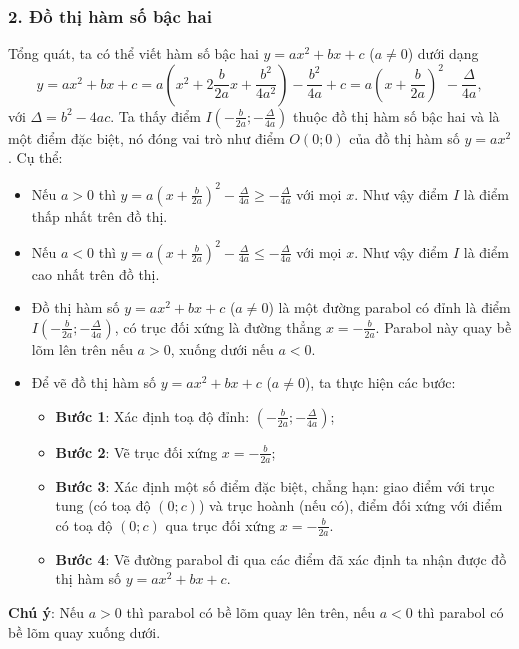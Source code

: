 \documentclass[12pt,a4paper]{extarticle}
\begin{document}
\subsubsection*{2. Đồ thị hàm số bậc hai}
Tổng quát, ta có thể viết hàm số bậc hai $y = ax^2 + bx + c$ ($a \neq 0$) dưới dạng
\[ y = ax^2 + bx + c = a \left( x^2 + 2\frac{b}{2a}x + \frac{b^2}{4a^2} \right) - \frac{b^2}{4a} + c = a \left( x + \frac{b}{2a} \right)^2 - \frac{\Delta}{4a}, \]
với $\Delta = b^2 - 4ac$.
Ta thấy điểm $I \left( -\frac{b}{2a}; -\frac{\Delta}{4a} \right)$ thuộc đồ thị hàm số bậc hai và là một điểm đặc biệt, nó đóng vai trò như điểm $O(0; 0)$ của đồ thị hàm số $y = ax^2$. Cụ thể:
\begin{itemize}
    \item Nếu $a > 0$ thì $y = a \left( x + \frac{b}{2a} \right)^2 - \frac{\Delta}{4a} \geq -\frac{\Delta}{4a}$ với mọi $x$. Như vậy điểm $I$ là điểm thấp nhất trên đồ thị.
    \item Nếu $a < 0$ thì $y = a \left( x + \frac{b}{2a} \right)^2 - \frac{\Delta}{4a} \leq -\frac{\Delta}{4a}$ với mọi $x$. Như vậy điểm $I$ là điểm cao nhất trên đồ thị.
\end{itemize}
\begin{itemize}
    \item Đồ thị hàm số $y = ax^2 + bx + c$ ($a \neq 0$) là một đường parabol có đỉnh là điểm $I \left( -\frac{b}{2a}; -\frac{\Delta}{4a} \right)$, có trục đối xứng là đường thẳng $x = -\frac{b}{2a}$. Parabol này quay bề lõm lên trên nếu $a > 0$, xuống dưới nếu $a < 0$.
    
    \item Để vẽ đồ thị hàm số $y = ax^2 + bx + c$ ($a \neq 0$), ta thực hiện các bước:
    \begin{itemize}
        \item \textbf{Bước 1}: Xác định toạ độ đỉnh: $\left( -\frac{b}{2a}; -\frac{\Delta}{4a} \right)$;
        \item \textbf{Bước 2}: Vẽ trục đối xứng $x = -\frac{b}{2a}$;
        \item \textbf{Bước 3}: Xác định một số điểm đặc biệt, chẳng hạn: giao điểm với trục tung (có toạ độ $(0; c)$) và trục hoành (nếu có), điểm đối xứng với điểm có toạ độ $(0; c)$ qua trục đối xứng $x = -\frac{b}{2a}$.
        \item \textbf{Bước 4}: Vẽ đường parabol đi qua các điểm đã xác định ta nhận được đồ thị hàm số $y = ax^2 + bx + c$.
    \end{itemize}
\end{itemize}
\noindent \textbf{Chú ý}: Nếu $a > 0$ thì parabol có bề lõm quay lên trên, nếu $a < 0$ thì parabol có bề lõm quay xuống dưới.
\end{document}
